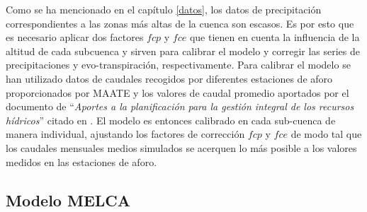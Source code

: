 Como se ha mencionado en el capítulo \ref{datos}, los datos de precipitación correspondientes a las zonas más 
altas de la cuenca son escasos. Es por esto que es necesario aplicar  dos factores $fcp$ y $fce$ 
que tienen en cuenta la influencia de la altitud de cada subcuenca y
 sirven para calibrar el modelo y corregir las series de precipitaciones y evo-transpiración, respectivamente.
 Para calibrar el modelo se han utilizado datos de caudales recogidos por diferentes estaciones de aforo proporcionados por
 MAATE \cite{MAATE} y los valores de caudal promedio aportados por el documento de ``\textit{Aportes a la planificación para 
 la gestión integral de los recursos hídricos}'' citado en \cite{Rodriguez}. 
 El modelo es entonces calibrado en cada sub-cuenca de manera individual, ajustando los factores de corrección $fcp$ y $fce$ 
 de modo tal que los caudales   mensuales medios  simulados se acerquen lo más posible a los valores medidos en las estaciones de aforo.
 
 
 
 
 
 
 
 



\subsection{Modelo MELCA}

